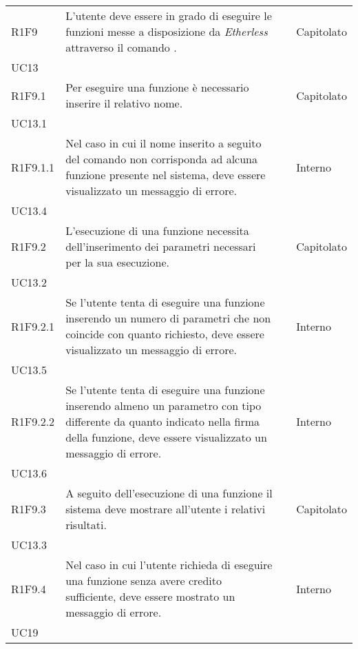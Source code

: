 \begin{longtable}{ 
		>{\centering}p{} 
		>{}p{} 
		>{\centering}p{}
		>{\centering}p{} }
	R1F9 & L'utente deve essere in grado di eseguire le funzioni messe a 
		disposizione da \textit{Etherless} attraverso il comando \run{}.				& \ob & Capitolato \\ UC13 \tabularnewline
	R1F9.1 & Per eseguire una funzione è necessario inserire il relativo nome. 		& \ob & Capitolato \\ UC13.1 \tabularnewline
	R1F9.1.1 & Nel caso in cui il nome inserito a seguito del comando \run{} non 
		corrisponda ad alcuna funzione presente nel sistema, deve essere 
		visualizzato un messaggio di errore.										& \ob & Interno \\ UC13.4 \tabularnewline 
	R1F9.2 & L'esecuzione di una funzione necessita dell'inserimento dei parametri 
		necessari per la sua esecuzione.												& \ob & Capitolato \\ UC13.2 \tabularnewline
	R1F9.2.1 & Se l'utente tenta di eseguire una funzione inserendo un numero 
		di parametri che non coincide con quanto richiesto, deve essere 
		visualizzato un messaggio di errore. 										& \ob & Interno \\ UC13.5 \tabularnewline
	R1F9.2.2 & Se l'utente tenta di eseguire una funzione inserendo almeno un parametro 
		con tipo differente da quanto indicato nella firma della funzione, deve essere 
		visualizzato un messaggio di errore. 										& \ob & Interno \\ UC13.6 \tabularnewline
	R1F9.3 & A seguito dell'esecuzione di una funzione il sistema deve mostrare 
		all'utente i relativi risultati. 											& \ob & Capitolato \\ UC13.3 \tabularnewline
	R1F9.4 & Nel caso in cui l'utente richieda di eseguire una funzione senza 
		avere credito sufficiente, deve essere mostrato un messaggio di errore.		& \ob & Interno \\ UC19 \tabularnewline
	

\end{longtable}
